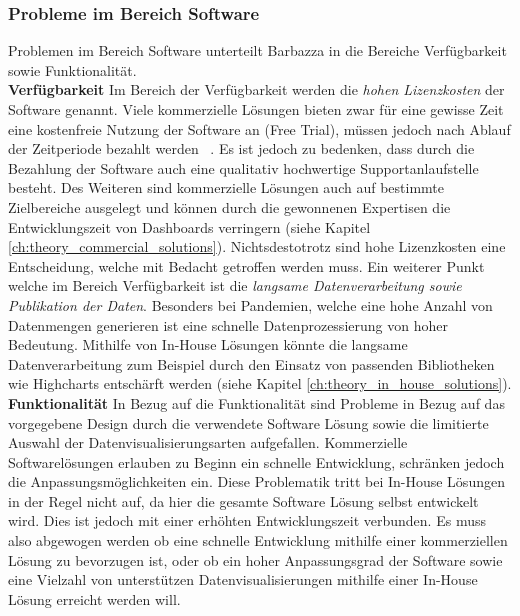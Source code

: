 \subsubsection{Probleme im Bereich Software}
Problemen im Bereich Software unterteilt Barbazza in die Bereiche Verfügbarkeit sowie Funktionalität.\\

\noindent
\textbf{Verfügbarkeit}
\newline
\indent
Im Bereich der Verfügbarkeit werden die \textit{hohen Lizenzkosten} der Software genannt. Viele kommerzielle Lösungen bieten zwar für eine gewisse Zeit eine kostenfreie Nutzung der Software an (Free Trial), müssen jedoch nach Ablauf der Zeitperiode bezahlt werden ~\citep[S. 15]{barbazza}. Es ist jedoch zu bedenken, dass durch die Bezahlung der Software auch eine qualitativ hochwertige Supportanlaufstelle besteht. Des Weiteren sind kommerzielle Lösungen auch auf bestimmte Zielbereiche ausgelegt und können durch die gewonnenen Expertisen die Entwicklungszeit von Dashboards verringern (siehe Kapitel \ref{ch:theory_commercial_solutions}). Nichtsdestotrotz sind hohe Lizenzkosten eine Entscheidung, welche mit Bedacht getroffen werden muss. Ein weiterer Punkt welche im Bereich Verfügbarkeit ist die \textit{langsame Datenverarbeitung sowie Publikation der Daten}. Besonders bei Pandemien, welche eine hohe Anzahl von Datenmengen generieren ist eine schnelle Datenprozessierung von hoher Bedeutung. Mithilfe von In-House Lösungen könnte die langsame Datenverarbeitung zum Beispiel durch den Einsatz von passenden Bibliotheken wie Highcharts entschärft werden (siehe Kapitel \ref{ch:theory_in_house_solutions}).\\

\noindent
\textbf{Funktionalität}
\newline
\indent
In Bezug auf die Funktionalität sind Probleme in Bezug auf das vorgegebene Design durch die verwendete Software Lösung sowie die limitierte Auswahl der Datenvisualisierungsarten aufgefallen. Kommerzielle Softwarelösungen erlauben zu Beginn ein schnelle Entwicklung, schränken jedoch die Anpassungsmöglichkeiten ein. Diese Problematik tritt bei In-House Lösungen in der Regel nicht auf, da hier die gesamte Software Lösung selbst entwickelt wird. Dies ist jedoch mit einer erhöhten Entwicklungszeit verbunden. Es muss also abgewogen werden ob eine schnelle Entwicklung mithilfe einer kommerziellen Lösung zu bevorzugen ist, oder ob ein hoher Anpassungsgrad der Software sowie eine Vielzahl von unterstützen Datenvisualisierungen mithilfe einer In-House Lösung erreicht werden will.

